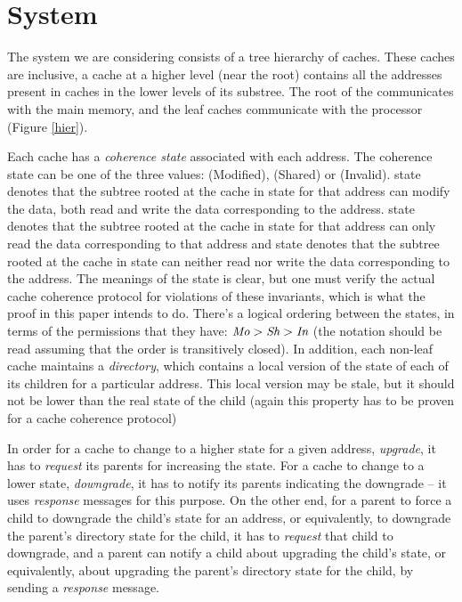 \section{System}
\label{sec:System}

The system we are considering consists of a tree hierarchy of caches. These
caches are inclusive, \ie a cache at a higher level (near the root) contains
all the addresses present in caches in the lower levels of its substree. The
root of the communicates with the main memory, and the leaf caches communicate
with the processor (Figure \ref{hier}).

Each cache has a \emph{coherence state} associated with each address. The
coherence state can be one of the three values: \Mo (Modified), \Sh (Shared) or
\In (Invalid). \Mo state denotes that the subtree rooted at the cache in \Mo
state for that address can modify the data, \ie both read and write the data
corresponding to the address. \Sh state denotes that the subtree rooted at the
cache in \Sh state for that address can only read the data corresponding to
that address and \In state denotes that the subtree rooted at the cache in \In
state can neither read nor write the data corresponding to the address. The
meanings of the state is clear, but one must verify the actual cache coherence
protocol for violations of these invariants, which is what the proof in this
paper intends to do. There's a logical ordering between the states, in terms of
the permissions that they have: $\textit{Mo} > \textit{Sh} > \textit{In}$ (the notation should be read
assuming that the order is transitively closed).
In addition, each non-leaf cache maintains a \emph{directory}, which contains a
local version of the state of each of its children for a particular address.
This local version may be stale, but it should not be lower than the real state
of the child (again this property has to be proven for a cache coherence
protocol)

In order for a cache to change to a higher state for a given address, \ie
\emph{upgrade}, it has to \emph{request} its parents for increasing the state.
For a cache to change to a lower state, \ie \emph{downgrade}, it has to notify
its parents indicating the downgrade -- it uses \emph{response} messages for
this purpose. On the other end, for a parent to force a child to downgrade the
child's state for an address, or equivalently, to downgrade the parent's
directory state for the child, it has to \emph{request} that child to
downgrade, and a parent can notify a child about upgrading the child's state,
or equivalently, about upgrading the parent's directory state for the child, by
sending a \emph{response} message.

